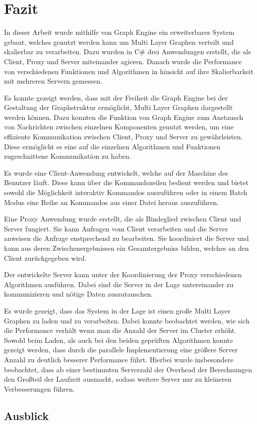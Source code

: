 \chapter{Fazit}

In dieser Arbeit wurde mithilfe von Graph Engine ein erweiterbares System gebaut, welches genutzt werden kann um Multi Layer Graphen verteilt und skalierbar zu verarbeiten.
Dazu wurden in C\# drei Anwendungen erstellt, die als Client, Proxy und Server miteinander agieren.
Danach wurde die Performance von verschiedenen Funktionen und Algorithmen in hinsicht auf ihre Skalierbarkeit mit mehreren Servern gemessen.


Es konnte gezeigt werden, dass mit der Freiheit die Graph Engine bei der Gestaltung der Graphstruktur ermöglicht, Multi Layer Graphen dargestellt werden können.
Dazu konnten die Funktion von Graph Engine zum Austausch von Nachrichten zwischen einzelnen Komponenten genutzt werden, um eine effiziente Kommunikation zwischen Client, Proxy und Server zu gewährleisten. 
Diese ermöglicht es eine auf die einzelnen Algorithmen und Funktionen zugeschnittene Kommunikation zu haben.


Es wurde eine Client-Anwendung entwickelt, welche auf der Maschine des Benutzer läuft. Diese kann über die Kommandozeilen bedient werden und bietet sowohl die Möglichkeit interaktiv Kommandos auszuführen oder in einem Batch Modus eine Reihe an Kommandos aus einer Datei heraus auszuführen.

Eine Proxy Anwendung wurde erstellt, die als Bindeglied zwischen Client und Server fungiert. Sie kann Anfragen vom Client verarbeiten und die Server anweisen die Anfrage enstprechend zu bearbeiten. Sie koordiniert die Server und kann aus deren Zwischenergebnissen ein Gesamtergebniss bilden, welches an den Client zurückgegeben wird.

Der entwickelte Server kann unter der Koordinierung der Proxy verschiedenen Algorithmen ausführen. Dabei sind die Server in der Lage untereinander zu kommunizieren und nötige Daten auszutauschen.


Es wurde gezeigt, dass das System in der Lage ist einen große Multi Layer Graphen zu laden und zu verarbeiten. Dabei konnte beobachtet werden, wie sich die Performance verhält wenn man die Anzahl der Server im Cluster erhöht.
Sowohl beim Laden, als auch bei den beiden geprüften Algorithmen konnte gezeigt werden, dass durch die parallele Implementierung eine größere Server Anzahl zu deutlich besserer Performance führt.
Hierbei wurde insbesondere beobachtet, dass ab einer bestimmten Serverzahl der Overhead der Berechnungen den Großteil der Laufzeit ausmacht, sodass weitere Server nur zu kleineren Verbesserungen führen.


\section{Ausblick}

